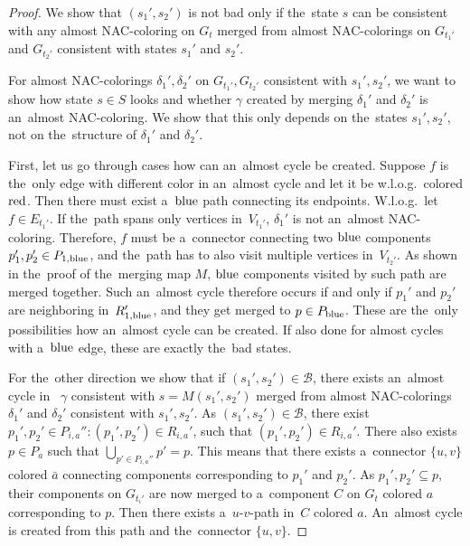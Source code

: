 \begin{proof}
	We show that \( (s_1', s_2') \) is not bad only if the~state \( s \)
	can be consistent with any almost NAC-coloring on \( G_t \)
	merged from almost NAC-colorings on \( G_{t_1'} \) and \( G_{t_2'} \)
	consistent with states \( s_1' \) and \( s_2' \).

	For almost NAC-colorings \( \delta_1', \delta_2' \) on \( G_{t_1'}, G_{t_2'} \)
	consistent with \( s_1', s_2' \),
	we want to show how state \( s \in S \) looks and
	whether \rbcol{} \( \gamma \) created by merging \( \delta_1' \) and \( \delta_2' \)
	is an~almost NAC-coloring.
	We show that this only depends on the~states \( s_1', s_2' \),
	not on the~structure of \( \delta_1' \) and \( \delta_2' \).

	First, let us go through cases how can an~almost cycle be created.
	Suppose \( f \) is the~only edge with different color
	in an~almost cycle and let it be w.l.o.g.\ colored \( \text{red} \).
	Then there must exist a~\( \text{blue} \) path connecting its endpoints.
	W.l.o.g.\ let \( f \in E_{t_1'} \).
	If the~path spans only vertices
	in~\( V_{t_1'} \), \( \delta_1' \) is not an~almost NAC-coloring.
	Therefore, \( f \) must be
	a~connector connecting two \( \text{blue} \) components \( p_1', p_2' \in P_{1,\text{blue}} \),
	and the~path has to also visit multiple vertices in~\( V_{t_2'} \).
	As shown in the~proof of the~merging map \( M \), \( \text{blue} \) components
	visited by such path are merged together.
	Such an~almost cycle therefore occurs
	if and only if \( p_1' \) and \( p_2' \) are neighboring in~\( R_{1,\text{blue}}' \),
	and they get merged to \( p \in P_{\text{blue}} \).
	These are the~only possibilities how an~almost cycle can be created.
	If also done for almost cycles with a~\( \text{blue} \) edge,
	these are exactly the~bad states.

	For the~other direction we show that if \( (s_1', s_2') \in \mathcal{B} \),
	there exists an~almost cycle
	in~\rbcol{} \( \gamma \) consistent with \( s = M(s_1', s_2') \)
	merged from almost NAC-colorings \( \delta_1' \) and \( \delta_2' \)
	consistent with \( s_1', s_2' \).
	As \( (s_1', s_2') \in \mathcal{B} \),
	there exist \( p_1', p_2' \in P_{i, a}'' : (p_1', p_2') \in R_{i, a}' \),
	such that \( (p_1', p_2') \in R_{i, a}' \).
	There also exists \( p \in P_{a} \) such that \( \bigcup_{p' \in P_{i, a}''} p' = p \).
	This means that there exists a~connector \( \{u, v\} \) colored \( \bar{a} \) connecting
	components corresponding to \( p_1' \) and \( p_2' \).
	As \( p_1', p_2' \subseteq p \),
	their components on \( G_{t_i'} \) are now merged
	to a~component \( C \) on \( G_t \) colored \( a \) corresponding to \( p \).
	Then there exists a~\( u \)-\( v \)-path in~\( C \) colored \( a \).
	An~almost cycle is created from this path and the~connector \( \{u, v\} \).
\end{proof}
%

